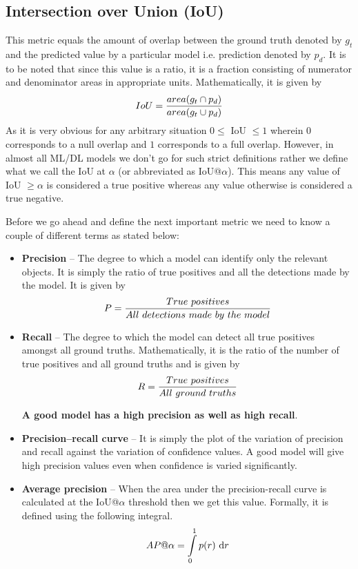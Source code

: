 \subsection{Intersection over Union (IoU)}
This metric equals the amount of overlap between the ground truth denoted by $g_t$ and the predicted value by a particular model i.e. prediction denoted by $p_d$. It is to be noted that since this value is a ratio, it is a fraction consisting of numerator and denominator areas in appropriate units. Mathematically, it is given by
\begin{equation}
\centering
IoU = \frac{area({g_{t}}\cap{ p_{d }})}{area({g_{t}}\cup{ p_{d }})}
\end{equation}
As it is very obvious for any arbitrary situation $0 \leqslant $ IoU $\leqslant 1$ wherein $0$ corresponds to a null overlap and $1$ corresponds to a full overlap. However, in almost all ML/DL models we don’t go for such strict definitions rather we define what we call the IoU at $\alpha$ (or abbreviated as IoU@$\alpha$). This means any value of IoU $\geqslant \alpha$ is considered a true positive whereas any value otherwise is considered a true negative. \par

Before we go ahead and define the next important metric we need to know a couple of different terms as stated below:
\begin{itemize}
 \item \textbf{Precision} – The degree to which a model can identify only the relevant objects. It is simply the ratio of true positives and all the detections made by the model. It is given by
\begin{equation}
\centering
P = \frac{True \ positives}{All \ detections \ made \ by \ the \ model}
\end{equation}
 \item \textbf{Recall} – The degree to which the model can detect all true positives amongst all ground truths. Mathematically, it is the ratio of the number of true positives and all ground truths and is given by
\begin{equation}
\centering
R = \frac{True \ positives}{All \ ground \ truths}

\end{equation}

\textbf{A good model has a high precision as well as high recall}.

 \item \textbf{Precision–recall curve} – It is simply the plot of the variation of precision and recall against the variation of confidence values. A good model will give high precision values even when confidence is varied significantly.
 \item \textbf{Average precision} – When the area under the precision-recall curve is calculated at the IoU@$\alpha$ threshold then we get this value. Formally, it is defined using the following integral.
\begin{equation}
\centering
AP@\alpha = \int\limits_{0}^{1} p(r) \ \mathrm{d} r
\end{equation}

\end{itemize}


